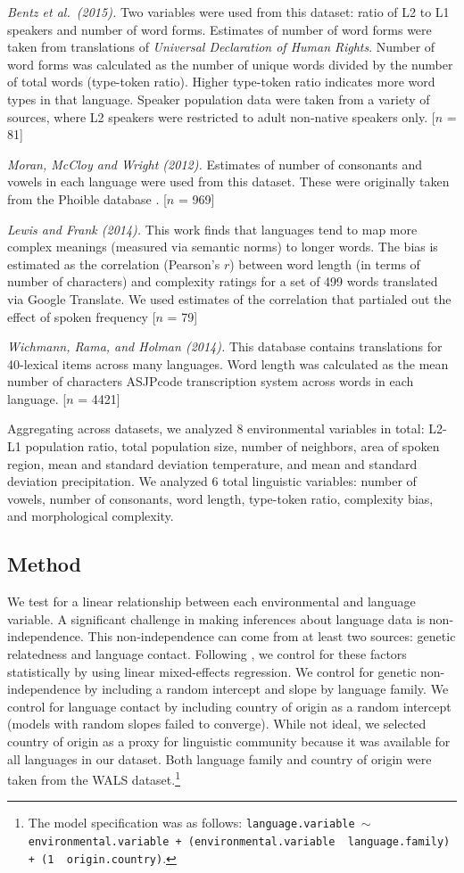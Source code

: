 \documentclass[10pt,letterpaper]{article}
\begin{document}
{\it Bentz et al.\ (2015).} Two variables were used from this dataset: ratio of L2 to L1 speakers and number of word forms. Estimates of number of word forms were taken from translations of  {\it Universal Declaration of Human Rights}. Number of word forms was calculated as the number of unique words divided by the number of total words (type-token ratio). Higher type-token ratio indicates more word types in that language. Speaker population data were taken from a variety of sources, where L2 speakers were restricted to adult non-native speakers only. [$n$ = 81]

{\it Moran, McCloy and Wright (2012).} Estimates of number of consonants and vowels in each language were used from this dataset. These were originally taken from the Phoible database \cite{phoible}. [$n$ = 969]

{\it Lewis and Frank (2014).} This work finds that languages tend to map more complex meanings (measured via semantic norms) to longer words. The bias is estimated as the correlation (Pearson's $r$) between word length (in terms of number of characters) and complexity ratings for a set of 499 words translated via Google Translate. We used estimates of the correlation that partialed out the effect of spoken frequency [$n$ = 79]

{\it Wichmann, Rama, and Holman (2014).} This database contains translations for 40-lexical items across many languages. Word length was calculated as the mean number of characters ASJPcode transcription system across words in each language. [$n$ = 4421]

Aggregating across datasets, we analyzed 8 environmental variables in total: L2-L1 population ratio, total population size, number of neighbors, area of spoken region, mean and standard deviation temperature, and mean and standard deviation precipitation. We analyzed 6 total linguistic variables: number of vowels, number of consonants, word length, type-token ratio, complexity bias, and morphological complexity.


\subsection{Method}
We test for a linear relationship between each environmental and language variable.  A significant challenge in making inferences about language data is non-independence. This non-independence can come from at least two sources: genetic relatedness and language contact. Following , we control for these factors statistically by using linear mixed-effects regression. We control for genetic non-independence by including a random intercept and slope by language family. We control for language contact by including country of origin as a random intercept (models with random slopes failed to converge). While not ideal, we selected country of origin as a proxy for linguistic community because it  was available for all languages in our dataset. Both language family and country of origin were taken from the WALS dataset.\footnote{The model specification was as follows:  \texttt{language.variable $\sim$ environmental.variable + (environmental.variable~\textbar~language.family) +  (1~\textbar~origin.country)}.} 
\end{document}
